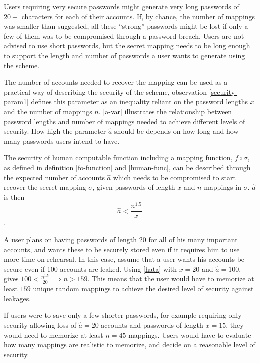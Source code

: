 \par Users requiring very secure passwords might generate very long passwords of $20+$ characters for each of their accounts. If, by chance, the number of mappings was smaller than suggested, all these ``strong'' passwords might be lost if only a few of them was to be compromised through a password breach. Users are not advised to use short passwords, but the secret mapping needs to be long enough to support the length and number of passwords a user wants to generate using the scheme.

\par The number of accounts needed to recover the mapping can be used as a practical way of describing the security of the scheme, observation \ref{security-param1} defines this parameter as an inequality reliant on the password lengths $x$ and the number of mappings $n$. \autoref{a-var} illustrates the relationship between password lengths and number of mappings needed to achieve different levels of security. How high the parameter $\hat a$ should be depends on how long and how many passwords users intend to have. 


\begin{observation}
    \label{security-param1}
    The security of human computable function including a mapping function, $f \circ \sigma$, as defined in definition \ref{fo-function} and \autoref{human-func}, can be described through the expected number of accounts $\hat a$ which needs to be compromised to start recover the secret mapping $\sigma$, given passwords of length $x$ and $n$ mappings in $\sigma$. $\hat a$ is then 
\begin{equation} \hat a < \frac{n^{ 1.5 }}{x} \label{hata} \end{equation}.
    \label{a-theorem}
\end{observation}

\begin{example}
    A user plans on having passwords of length 20 for all of his many important accounts, and wants these to be securely stored even if it requires him to use more time on rehearsal. In this case, assume that a user wants his accounts be secure even if 100 accounts are leaked. Using \autoref{hata} with $x=20$ and $\hat a = 100$, gives $100 < \frac{n^{1.5}}{20} \implies n > 159$. This means that the user would have to memorize at least $159$ unique random mappings to achieve the desired level of security against leakages. 
    \par If users were to save only a few shorter passwords, for example requiring only security allowing loss of $\hat a = 20$ accounts and passwords of length $x=15$, they would need to memorize at least $n=45$ mappings. Users would have to evaluate how many mappings are realistic to memorize, and decide on a reasonable level of security.
\end{example}


